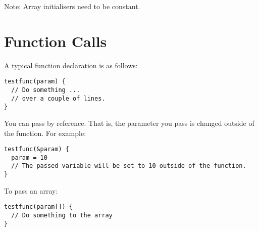 \begin{Desc}
\item[Note:]Array initialisers need to be constant.\end{Desc}
\hypertarget{Small_Page_Small_Func_Calls_Section}{}\section{Function Calls}\label{Small_Page_Small_Func_Calls_Section}
A typical function declaration is as follows:



\begin{Code}\begin{verbatim}testfunc(param) {
  // Do something ...
  // over a couple of lines.
}
\end{verbatim}
\end{Code}



You can pass by reference. That is, the parameter you pass is changed outside of the function. For example:



\begin{Code}\begin{verbatim}testfunc(&param) {
  param = 10
  // The passed variable will be set to 10 outside of the function.
}
\end{verbatim}
\end{Code}



To pass an array:



\begin{Code}\begin{verbatim}testfunc(param[]) {
  // Do something to the array
}
\end{verbatim}
\end{Code}



